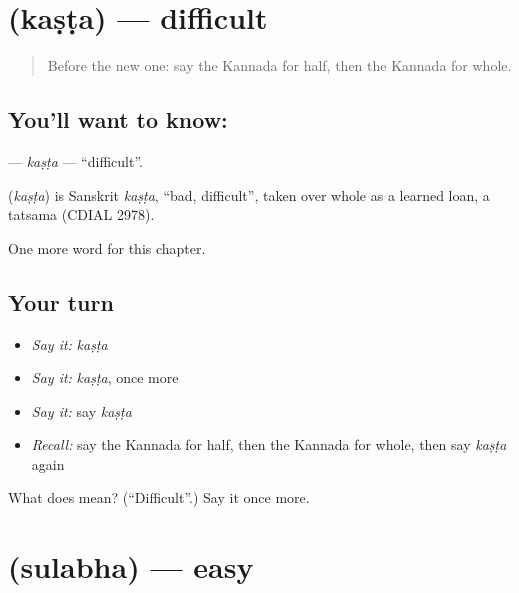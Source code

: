 \section[\texorpdfstring{\kn{ಕಷ್ಟ} (kaṣṭa)}{ಕಷ್ಟ (kaṣṭa)}]{ (kaṣṭa) — difficult}

\label{lesson:KA-C290-kasta}



\begin{quote}
Before the new one: say the Kannada for half, then the Kannada for whole.
\end{quote}

\subsection*{You'll want to know: }
\textbf{} — \emph{kaṣṭa} — \textquotedblleft{}difficult\textquotedblright{}.

\begin{cousinweb}
\textbf{} (\emph{kaṣṭa}) is Sanskrit \emph{kaṣṭa}, \textquotedblleft{}bad, difficult\textquotedblright{}, taken over whole as a learned loan, a tatsama (CDIAL 2978).
\end{cousinweb}

\begin{grammarlens}[title={What you've built}]
One more word for this chapter.
\end{grammarlens}

\subsection*{Your turn}
\begin{itemize}
\raggedright
  \item \emph{Say it:} \emph{kaṣṭa}
  \item \emph{Say it:} \emph{kaṣṭa}, once more
  \item \emph{Say it:} say \emph{kaṣṭa}
  \item \emph{Recall:} say the Kannada for half, then the Kannada for whole, then say \emph{kaṣṭa} again
\end{itemize}

\begin{tcolorbox}[breakable,colback=teal!4,colframe=teal!35!black,title={Before you move on}]
What does  mean? (\textquotedblleft{}Difficult\textquotedblright{}.) Say it once more.
\end{tcolorbox}
\section[\texorpdfstring{\kn{ಸುಲಭ} (sulabha)}{ಸುಲಭ (sulabha)}]{ (sulabha) — easy}

